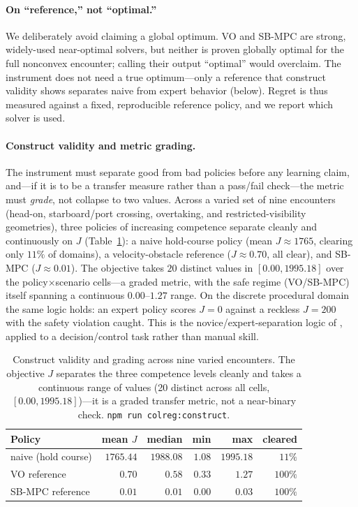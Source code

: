 \documentclass{article}
\begin{document}
\paragraph{On ``reference,'' not ``optimal.''} We deliberately avoid claiming a global
optimum. VO and SB-MPC are strong, widely-used near-optimal solvers, but neither is proven
globally optimal for the full nonconvex encounter; calling their output ``optimal'' would
overclaim. The instrument does not need a true optimum---only a reference that construct
validity shows separates naive from expert behavior (below). Regret is thus measured
against a fixed, reproducible reference policy, and we report which solver is used.

\paragraph{Construct validity and metric grading.} The instrument must separate good from
bad policies before any learning claim, and---if it is to be a transfer measure rather than
a pass/fail check---the metric must \emph{grade}, not collapse to two values. Across a
varied set of nine encounters (head-on, starboard/port crossing, overtaking, and
restricted-visibility geometries), three policies of increasing competence separate cleanly
and continuously on $J$ (Table~\ref{tab:construct}): a naive hold-course policy
(mean $J\approx1765$, clearing only $11\%$ of domains), a velocity-obstacle reference
($J\approx0.70$, all clear), and SB-MPC ($J\approx0.01$). The objective takes $20$ distinct
values in $[0.00, 1995.18]$ over the policy$\times$scenario cells---a graded metric, with
the safe regime (VO/SB-MPC) itself spanning a continuous $0.00$--$1.27$ range. On the
discrete procedural domain the same logic holds: an expert policy scores $J=0$ against a
reckless $J=200$ with the safety violation caught. This is the novice/expert-separation
logic of \citet{vandongen2007lapsim}, applied to a decision/control task rather than manual
skill.

\begin{table}[t]
\centering
\small
\begin{tabular}{@{}lrrrrr@{}}
\toprule
Policy & mean $J$ & median & min & max & cleared \\
\midrule
naive (hold course) & $1765.44$ & $1988.08$ & $1.08$ & $1995.18$ & $11\%$ \\
VO reference & $0.70$ & $0.58$ & $0.33$ & $1.27$ & $100\%$ \\
SB-MPC reference & $0.01$ & $0.01$ & $0.00$ & $0.03$ & $100\%$ \\
\bottomrule
\end{tabular}
\caption{Construct validity and grading across nine varied encounters. The objective $J$
separates the three competence levels cleanly and takes a continuous range of values
(20 distinct across all cells, $[0.00, 1995.18]$)---it is a graded transfer metric, not a
near-binary check. \texttt{npm run colreg:construct}.}
\label{tab:construct}
\end{table}
\end{document}
